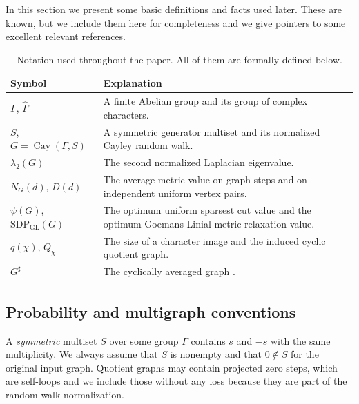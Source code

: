 \documentclass[11pt]{article}
\theoremstyle{definition}
\theoremstyle{remark}
\newcommand{\Gammahat}{\widehat{\Gamma}}
\newcommand{\Cay}{\operatorname{Cay}}
\newcommand{\gl}{\operatorname{SDP_{GL}}}
\begin{document}
In this section we present some basic definitions and facts used later. These are known, but we include them here for completeness and we give pointers to some excellent relevant references. 

\begin{table}[H]
\centering
\small
\renewcommand{\arraystretch}{1.18}
\begin{tabular}{>{\raggedright\arraybackslash}p{} >{\raggedright\arraybackslash}p{}}
\toprule
\textbf{Symbol} & \textbf{Explanation} \\
\midrule
$\Gamma$, $\Gammahat$ & A finite Abelian group and its group of complex characters. \\
$S$, $G=\Cay(\Gamma,S)$ & A symmetric generator multiset and its normalized Cayley random walk. \\
$\lambda_2(G)$ & The second normalized Laplacian eigenvalue. \\
$N_G(d)$, $D(d)$ & The average metric value on graph steps and on independent uniform vertex pairs. \\
$\psi(G)$, $\gl(G)$ & The optimum uniform sparsest cut value and the optimum Goemans-Linial metric relaxation value. \\
$q(\chi)$, $Q_\chi$ & The size of a character image and the induced cyclic quotient graph. \\
$G^\sharp$ & The cyclically averaged graph . \\
\bottomrule
\end{tabular}
\caption{Notation used throughout the paper. All of them are formally defined below.}
\label{tab:notation}
\end{table}

\subsection{Probability and multigraph conventions}


A \emph{symmetric} multiset $S$ over some group $\Gamma$ contains $s$ and $-s$ with the same multiplicity. We always assume that $S$ is nonempty and that $0 \notin S$ for the original input graph. Quotient graphs may contain projected zero steps, which are self-loops and we include those without any loss because they are part of the random walk normalization.
\end{document}
